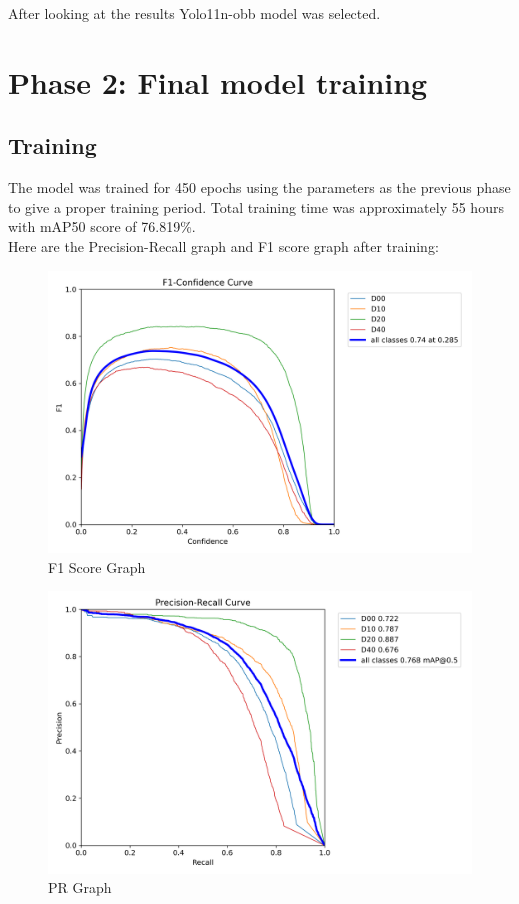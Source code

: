 After looking at the results Yolo11n-obb model was selected.

\section{Phase 2: Final model training}

\subsection{Training}
The model was trained for 450 epochs using the parameters as the previous phase to give a proper training period.
Total training time was approximately 55 hours with mAP50 score of 76.819\%.
\\
Here are the Precision-Recall graph and F1 score graph after training:
\begin{figure}[H]
    \centering
    \includegraphics[width=0.8\linewidth]{figures/orignal results/F1_curve.png}
    \caption{F1 Score Graph}
\end{figure}
\begin{figure}[H]
    \centering
    \includegraphics[width=0.8\linewidth]{figures/orignal results/PR_curve.png}
    \caption{PR Graph}
\end{figure}

